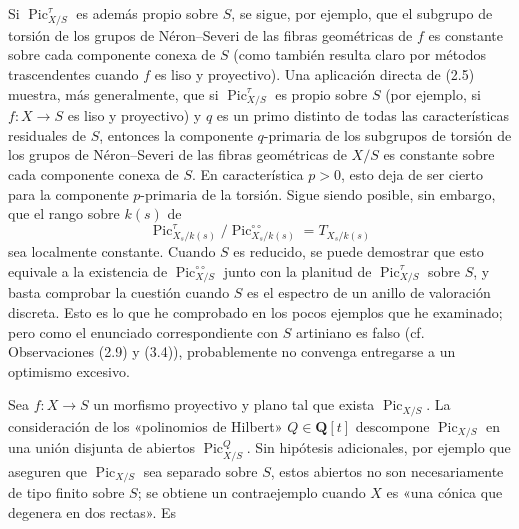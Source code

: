  Si $\operatorname{Pic}_{X/S}^\tau$ es además propio sobre
$S$, se sigue, por ejemplo, que el subgrupo de torsión de los grupos de
Néron--Severi de las fibras geométricas de $f$ es constante sobre cada
componente conexa de $S$ (como también resulta claro por métodos trascendentes
cuando $f$ es liso y proyectivo). Una aplicación directa de (2.5) muestra, más
generalmente, que si $\operatorname{Pic}_{X/S}^\tau$ es propio sobre $S$ (por
ejemplo, si $f:X\longrightarrow S$ es liso y proyectivo) y $q$ es un primo
distinto de todas las características residuales de $S$, entonces la
componente $q$-primaria de los subgrupos de torsión de los grupos de
Néron--Severi de las fibras geométricas de $X/S$ es constante sobre cada
componente conexa de $S$. En característica $p>0$, esto deja de ser cierto para
la componente $p$-primaria de la torsión. Sigue siendo posible, sin embargo,
que el rango sobre $k(s)$ de
\[
\operatorname{Pic}_{X_s/k(s)}^\tau/
\operatorname{Pic}_{X_s/k(s)}^{\circ\circ}=T_{X_s/k(s)}
\]
sea localmente constante. Cuando $S$ es reducido, se puede demostrar que esto
equivale a la existencia de $\operatorname{Pic}_{X/S}^{\circ\circ}$ junto con
la planitud de $\operatorname{Pic}_{X/S}^\tau$ sobre $S$, y basta comprobar la
cuestión cuando $S$ es el espectro de un anillo de valoración discreta. Esto es
lo que he comprobado en los pocos ejemplos que he examinado; pero como el
enunciado correspondiente con $S$ artiniano es falso (cf. Observaciones (2.9)
y (3.4)), probablemente no convenga entregarse a un optimismo excesivo.


Sea $f:X\longrightarrow S$ un morfismo proyectivo y plano tal que exista
$\operatorname{Pic}_{X/S}$. La consideración de los «polinomios de Hilbert»
$Q\in\mathbf Q[t]$ descompone $\operatorname{Pic}_{X/S}$ en una unión disjunta
de abiertos $\operatorname{Pic}_{X/S}^Q$. Sin hipótesis adicionales, por
ejemplo que aseguren que $\operatorname{Pic}_{X/S}$ sea separado sobre $S$,
estos abiertos no son necesariamente de tipo finito sobre $S$; se obtiene un
contraejemplo cuando $X$ es «una cónica que degenera en dos rectas». Es

